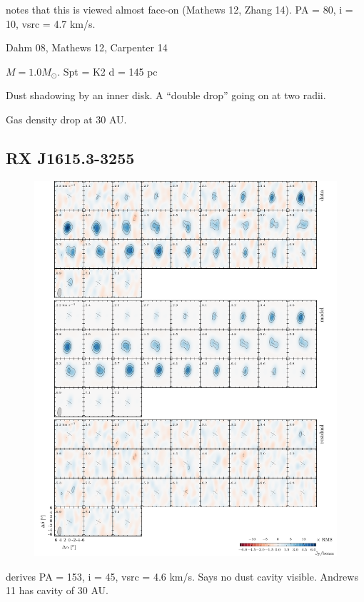 \documentclass[twocolumn]{aastex6}
\begin{document}
\citep{vandermarel15} notes that this is viewed almost face-on (Mathews 12, Zhang 14). PA = 80, i = 10, vsrc = 4.7 km/s.

Dahm 08, Mathews 12, Carpenter 14

$M = 1.0 M_\odot$.
Spt = K2
d = 145 pc

Dust shadowing by an inner disk. A ``double drop'' going on at two radii.

Gas density drop at 30 AU.

\subsection{RX J1615.3-3255}
\begin{figure}[htb]
\begin{center}
  \includegraphics[draft]{RXJ1615.pdf}
  \end{center}
\end{figure}

\citep{vandermarel15} derives PA = 153, i = 45, vsrc = 4.6 km/s. Says no dust cavity visible. Andrews 11 has cavity of 30 AU.
\end{document}
